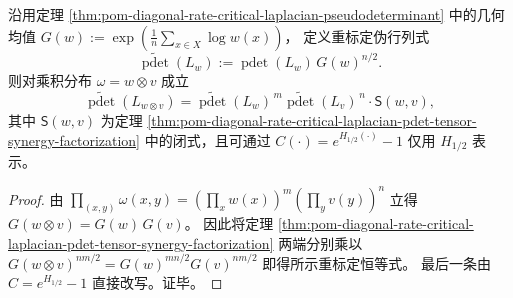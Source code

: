 \begin{corollary}\label{cor:pom-diagonal-rate-critical-laplacian-pdet-tensor-synergy-geometricmean-stripped}
沿用定理 \ref{thm:pom-diagonal-rate-critical-laplacian-pseudodeterminant} 中的几何均值
\(
G(w):=\exp(\frac1n\sum_{x\in X}\log w(x))
\)，
定义重标定伪行列式
\[
\widetilde{\operatorname{pdet}}(L_w):=\operatorname{pdet}(L_w)\,G(w)^{n/2}.
\]
则对乘积分布 \(\omega=w\otimes v\) 成立
\[
\widetilde{\operatorname{pdet}}(L_{w\otimes v})
=\widetilde{\operatorname{pdet}}(L_w)^{\,m}\widetilde{\operatorname{pdet}}(L_v)^{\,n}\cdot \mathsf S(w,v),
\]
其中 \(\mathsf S(w,v)\) 为定理 \ref{thm:pom-diagonal-rate-critical-laplacian-pdet-tensor-synergy-factorization} 中的闭式，且可通过
\(
C(\cdot)=e^{H_{1/2}(\cdot)}-1
\)
仅用 \(H_{1/2}\) 表示。
\end{corollary}
\begin{proof}
由 \(\prod_{(x,y)}\omega(x,y)=(\prod_x w(x))^m(\prod_y v(y))^n\) 立得 \(G(w\otimes v)=G(w)\,G(v)\)。
因此将定理 \ref{thm:pom-diagonal-rate-critical-laplacian-pdet-tensor-synergy-factorization} 两端分别乘以 \(G(w\otimes v)^{nm/2}=G(w)^{mn/2}G(v)^{nm/2}\) 即得所示重标定恒等式。
最后一条由 \(C=e^{H_{1/2}}-1\) 直接改写。证毕。
\end{proof}

